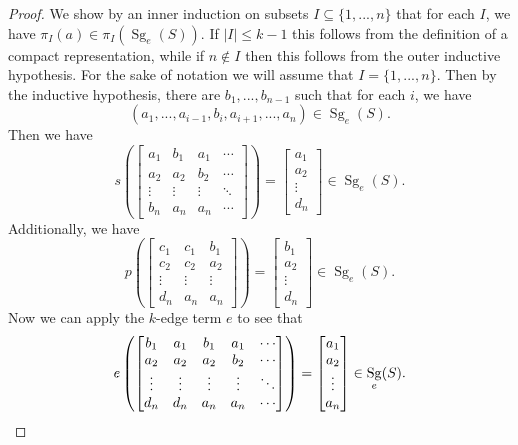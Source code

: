 \documentclass[letterpaper,11pt]{article}
\DeclareMathOperator{\Sg}{Sg}
\begin{document}
\begin{proof}
We show by an inner induction on subsets $I \subseteq \{1, ..., n\}$ that for each $I$, we have $\pi_I(a) \in \pi_I(\Sg_e(S))$. If $|I| \le k-1$ this follows from the definition of a compact representation, while if $n \not\in I$ then this follows from the outer inductive hypothesis. For the sake of notation we will assume that $I = \{1, ..., n\}$. Then by the inductive hypothesis, there are $b_1, ..., b_{n-1}$ such that for each $i$, we have
\[
(a_1, ..., a_{i-1}, b_i, a_{i+1}, ..., a_n) \in \Sg_e(S).
\]
Then we have
\[
s\left(\begin{bmatrix} a_1 & b_1 & a_1 & \cdots\\ a_2 & a_2 & b_2 & \cdots\\ \vdots & \vdots & \vdots & \ddots\\ b_n & a_n & a_n & \cdots\end{bmatrix}\right) = \begin{bmatrix} a_1\\ a_2\\ \vdots\\ d_n\end{bmatrix} \in \Sg_e(S).
\]
Additionally, we have
\[
p\left(\begin{bmatrix} c_1 & c_1 & b_1\\ c_2 & c_2 & a_2\\ \vdots & \vdots & \vdots\\ d_n & a_n & a_n\end{bmatrix}\right) = \begin{bmatrix} b_1\\ a_2\\ \vdots\\ d_n\end{bmatrix} \in \Sg_e(S).
\]
Now we can apply the $k$-edge term $e$ to see that
\[
e\left(\begin{bmatrix} b_1 & a_1 & b_1 & a_1 & \cdots\\ a_2 & a_2 & a_2 & b_2 & \cdots\\ \vdots & \vdots & \vdots & \vdots & \ddots\\ d_n & d_n & a_n & a_n & \cdots\end{bmatrix}\right) = \begin{bmatrix} a_1\\ a_2\\ \vdots\\ a_n\end{bmatrix} \in \Sg_e(S).\qedhere
\]
\end{proof}
\end{document}
